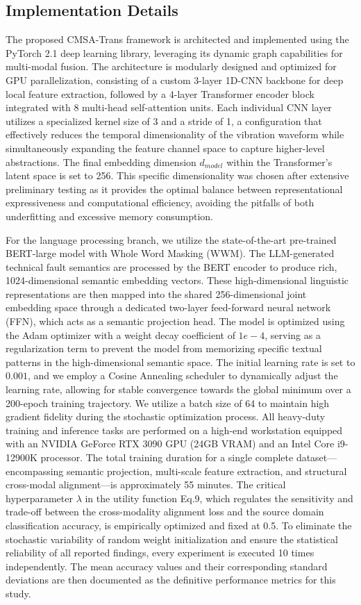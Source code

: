 \subsection{Implementation Details}
The proposed CMSA-Trans framework is architected and implemented using the PyTorch 2.1 deep learning library, leveraging its dynamic graph capabilities for multi-modal fusion. The architecture is modularly designed and optimized for GPU parallelization, consisting of a custom 3-layer 1D-CNN backbone for deep local feature extraction, followed by a 4-layer Transformer encoder block integrated with 8 multi-head self-attention units. Each individual CNN layer utilizes a specialized kernel size of 3 and a stride of 1, a configuration that effectively reduces the temporal dimensionality of the vibration waveform while simultaneously expanding the feature channel space to capture higher-level abstractions. The final embedding dimension $d_{model}$ within the Transformer's latent space is set to 256. This specific dimensionality was chosen after extensive preliminary testing as it provides the optimal balance between representational expressiveness and computational efficiency, avoiding the pitfalls of both underfitting and excessive memory consumption. 

For the language processing branch, we utilize the state-of-the-art pre-trained BERT-large model with Whole Word Masking (WWM). The LLM-generated technical fault semantics are processed by the BERT encoder to produce rich, 1024-dimensional semantic embedding vectors. These high-dimensional linguistic representations are then mapped into the shared 256-dimensional joint embedding space through a dedicated two-layer feed-forward neural network (FFN), which acts as a semantic projection head. The model is optimized using the Adam optimizer with a weight decay coefficient of $1e-4$, serving as a regularization term to prevent the model from memorizing specific textual patterns in the high-dimensional semantic space. The initial learning rate is set to $0.001$, and we employ a Cosine Annealing scheduler to dynamically adjust the learning rate, allowing for stable convergence towards the global minimum over a 200-epoch training trajectory. We utilize a batch size of 64 to maintain high gradient fidelity during the stochastic optimization process. All heavy-duty training and inference tasks are performed on a high-end workstation equipped with an NVIDIA GeForce RTX 3090 GPU (24GB VRAM) and an Intel Core i9-12900K processor. The total training duration for a single complete dataset—encompassing semantic projection, multi-scale feature extraction, and structural cross-modal alignment—is approximately 55 minutes. The critical hyperparameter $\lambda$ in the utility function Eq.9, which regulates the sensitivity and trade-off between the cross-modality alignment loss and the source domain classification accuracy, is empirically optimized and fixed at 0.5. To eliminate the stochastic variability of random weight initialization and ensure the statistical reliability of all reported findings, every experiment is executed 10 times independently. The mean accuracy values and their corresponding standard deviations are then documented as the definitive performance metrics for this study.



